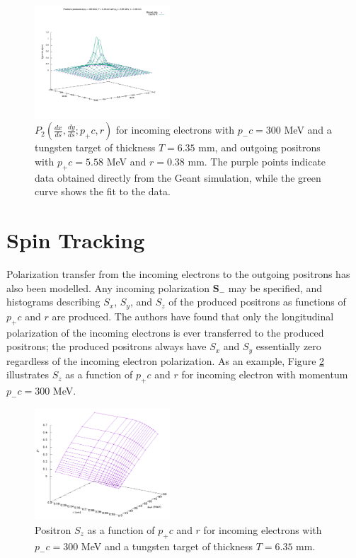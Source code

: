 \documentclass[letter,
               biblatex,     %
               keeplastbox,   %
               ]{jacow}
\newcommand{\dxds}{\frac{dx}{ds}}
\newcommand{\dyds}{\frac{dy}{ds}}
\begin{document}
\begin{figure}
\centering
\includegraphics[width=0.45\textwidth]{p2}
\caption{$P_2 \left( \dxds, \dyds ; p_+ c, r \right)$ for incoming electrons with $p_- c = 300$ MeV and a tungsten target of thickness $T = 6.35$ mm,
and outgoing positrons with $p_+ c = 5.58$ MeV and $r = 0.38$ mm.
The purple points indicate data obtained directly from the Geant simulation, while the green curve shows the fit to the data.
}
\label{fig:p2}
\end{figure}

%


\section{Spin Tracking}

Polarization transfer from the incoming electrons to the outgoing positrons has also been modelled.
Any incoming polarization $\mathbf{S}_-$ may be specified, and histograms describing $S_x$, $S_y$, and $S_z$ of the produced positrons as functions of $p_+ c$ and $r$ are produced.
The authors have found that only the longitudinal polarization of the incoming electrons is ever transferred to the produced positrons; the produced positrons always have $S_x$ and $S_y$ essentially zero regardless of the incoming electron polarization.
As an example, Figure \ref{fig:sz} illustrates $S_z$ as a function of $p_+ c$ and $r$ for incoming electron with momentum $p_- c = 300$ MeV.

\begin{figure}
\centering
\includegraphics[width=0.45\textwidth]{sz}
\caption{Positron $S_z$ as a function of $p_+ c$ and $r$ for incoming electrons with $p_- c = 300$ MeV and a tungsten target of thickness $T = 6.35$ mm.}
\label{fig:sz}
\end{figure}
\end{document}
